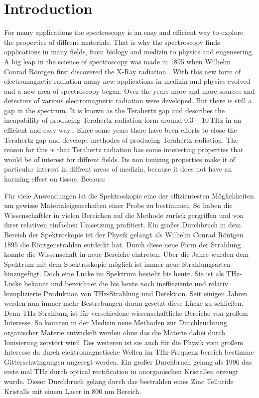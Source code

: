 \chapter{Introduction}
For many applications the spectroscopy is an easy and efficient way to explore the properties of diffrent materials.
That is why the spectroscopy finds applications in many fields, from biology and medizin to physics and engeneering.
A big leap in the science of spectroscopy was made in 1895 when Wilhelm Conrad Röntgen first discovered the X-Ray radiation \cite{roentgen}.
With this new form of electromagnetic radiation many new applications in medizin and physics evolved and a new area of spectroscopy began.
Over the years more and more sources and detectors of various electromagnetic radiation were developed.
But there is still a gap in the spectrum.
It is known as the Terahertz gap and describes the incapability of producing Terahertz radiation form around $0.3-10\,\si{\tera\hertz}$ in an efficient and easy way \cite[157--159]{THzgap_applications}.
Since some years there have been efforts to close the Terahertz gap and develope methodes of producing Terahertz radiation.
The reason for this is that Terahertz radiation has some interesting properties that would be of interest for diffrent fields.
Its non ionizing properties make it of particular interest in diffrent areas of medizin, because it does not have an harming effect on tissue.
Because 


Für viele Anwendungen ist die Spektroskopie eine der effizientesten Möglichkeiten um gewisse Materialeigenschaften einer Probe zu bestimmen.
So haben die Wissenschaftler in vielen Bereichen auf die Methode zurück gergriffen und von ihrer relativen einfachen Umsetzung profitiert.
Ein großer Durchbruch in dem Bereich der Spektroskopie ist der Physik gelangt als Wilhelm Conrad Röntgen 1895 %
die Röntgenstrahlen entdeckt hat.
Durch diese neue Form der Strahlung konnte die Wissenschaft in neue Bereiche eintreten.
Über die Jahre wurden dem Spektrum mit dem Spektroskopie möglich ist immer neue Strahlungsarten hinzugefügt.
Doch eine Lücke im Spektrum besteht bis heute.
Sie ist als THz-Lücke bekannt und bezeichnet die bis heute noch ineffieziente und relativ komplizierte Produktion von THz-Strahlung und Detektion.
Seit einigen Jahren werden nun immer mehr Bestrebungen daran gesetzt diese Lücke zu schließen.
Denn THz Strahlung ist für verschiedene wissenschaftliche Bereiche von großem Interesse.
So könnten in der Medizin neue Methoden zur Dutchleuchtung organischer Materie entwickelt werden ohne das die Materie dabei durch Ionisierung zerstört wird.
Des weiteren ist sie auch für die Physik vom großem Interesse da durch elektromagnetische Wellen im THz-Frequenz bereich bestimme Gitterschwingungen angeregt werden.
Ein großer Durchbruch gelang als 1996 das erste mal THz durch optical rectification in anorganischen Kristallen erzeugt wurde. %
Dieser Durchbruch gelang durch das bestrahlen eines Zinc Telluride Kristalls mit einem Laser in 800 nm Bereich.



